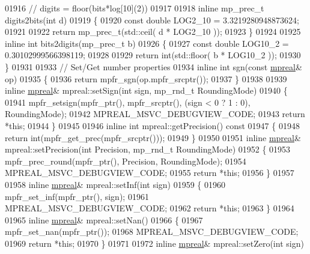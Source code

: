 \begin{DoxyCode}
{{01916 \textcolor{comment}{//        digits = floor(bits*log[10](2))}
01917 
01918 \textcolor{keyword}{inline} mp\_prec\_t digits2bits(\textcolor{keywordtype}{int} d)
01919 \{
01920     \textcolor{keyword}{const} \textcolor{keywordtype}{double} LOG2\_10 = 3.3219280948873624;
01921 
01922     \textcolor{keywordflow}{return} mp\_prec\_t(std::ceil( d * LOG2\_10 ));
01923 \}
01924 
01925 \textcolor{keyword}{inline} \textcolor{keywordtype}{int} bits2digits(mp\_prec\_t b)
01926 \{
01927     \textcolor{keyword}{const} \textcolor{keywordtype}{double} LOG10\_2 = 0.30102999566398119;
01928 
01929     \textcolor{keywordflow}{return} int(std::floor( b * LOG10\_2 ));
01930 \}
01931 
01933 \textcolor{comment}{// Set/Get number properties}
01934 \textcolor{keyword}{inline} \textcolor{keywordtype}{int} sgn(\textcolor{keyword}{const} \hyperlink{classmpfr_1_1mpreal}{mpreal}& op)
01935 \{
01936     \textcolor{keywordflow}{return} mpfr\_sgn(op.mpfr\_srcptr());
01937 \}
01938 
01939 \textcolor{keyword}{inline} \hyperlink{classmpfr_1_1mpreal}{mpreal}& mpreal::setSign(\textcolor{keywordtype}{int} sign, mp\_rnd\_t RoundingMode)
01940 \{
01941     mpfr\_setsign(mpfr\_ptr(), mpfr\_srcptr(), (sign < 0 ? 1 : 0), RoundingMode);
01942     MPREAL\_MSVC\_DEBUGVIEW\_CODE;
01943     \textcolor{keywordflow}{return} *\textcolor{keyword}{this};
01944 \}
01945 
01946 \textcolor{keyword}{inline} \textcolor{keywordtype}{int} mpreal::getPrecision()\textcolor{keyword}{ const}
01947 \textcolor{keyword}{}\{
01948     \textcolor{keywordflow}{return} int(mpfr\_get\_prec(mpfr\_srcptr()));
01949 \}
01950 
01951 \textcolor{keyword}{inline} \hyperlink{classmpfr_1_1mpreal}{mpreal}& mpreal::setPrecision(\textcolor{keywordtype}{int} Precision, mp\_rnd\_t RoundingMode)
01952 \{
01953     mpfr\_prec\_round(mpfr\_ptr(), Precision, RoundingMode);
01954     MPREAL\_MSVC\_DEBUGVIEW\_CODE;
01955     \textcolor{keywordflow}{return} *\textcolor{keyword}{this};
01956 \}
01957 
01958 \textcolor{keyword}{inline} \hyperlink{classmpfr_1_1mpreal}{mpreal}& mpreal::setInf(\textcolor{keywordtype}{int} sign)
01959 \{
01960     mpfr\_set\_inf(mpfr\_ptr(), sign);
01961     MPREAL\_MSVC\_DEBUGVIEW\_CODE;
01962     \textcolor{keywordflow}{return} *\textcolor{keyword}{this};
01963 \}
01964 
01965 \textcolor{keyword}{inline} \hyperlink{classmpfr_1_1mpreal}{mpreal}& mpreal::setNan()
01966 \{
01967     mpfr\_set\_nan(mpfr\_ptr());
01968     MPREAL\_MSVC\_DEBUGVIEW\_CODE;
01969     \textcolor{keywordflow}{return} *\textcolor{keyword}{this};
01970 \}
01971 
01972 \textcolor{keyword}{inline} \hyperlink{classmpfr_1_1mpreal}{mpreal}& mpreal::setZero(\textcolor{keywordtype}{int} sign)
}}
\end{DoxyCode}
